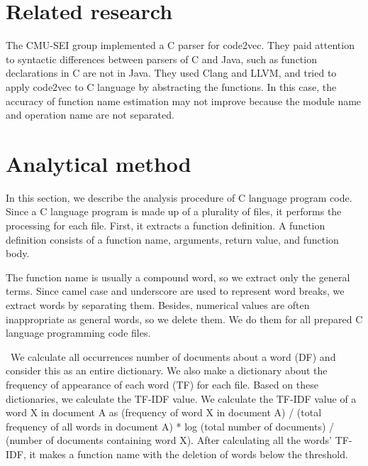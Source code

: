 \documentclass[JIP]{apris}
\begin{document}
\section{Related research}
The CMU-SEI group\cite{code2vec-c} implemented a C parser for code2vec.
They paid attention to syntactic differences between parsers of C and Java, such as function declarations in C are not in Java.
They used Clang and LLVM\cite{lattner2007clang}, and tried to apply code2vec to C language by abstracting the functions.
In this case, the accuracy of function name estimation may not improve because the module name and operation name are not separated.


\section{Analytical method}
In this section, we describe the analysis procedure of C language program code.
Since a C language program is made up of a plurality of files, it performs the processing for each file. First, it extracts a function definition. A function definition consists of a function name, arguments, return value, and function body.

The function name is usually a compound word, so we extract only the general terms. Since camel case and underscore are used to represent word breaks, we extract words by separating them.
Besides, numerical values ​​are often inappropriate as general words, so we delete them. We do them for all prepared C language programming code files.

 We calculate all occurrences number of documents about a word (DF) and consider this as an entire dictionary. We also make a dictionary about the frequency of appearance of each word (TF) for each file. Based on these dictionaries, we calculate the TF-IDF value.
We calculate the TF-IDF value of a word X in document A as (frequency of word X in document A) / (total frequency of all words in document A) * log (total number of documents) / (number of documents containing word X).
After calculating all the words' TF-IDF, it makes a function name with the deletion of words below the threshold.
\end{document}
